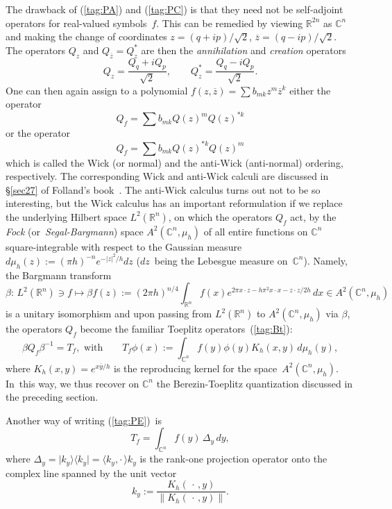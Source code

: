 \documentclass[12pt]{amsart}
\numberwithin{equation}{section}
\theoremstyle{remark}
\newcommand\spr[2]{\langle #1,#2\rangle}
\newcommand\RR{\mathbb R}
\newcommand{\be}{\begin{equation}}
\newcommand{\en}{\end{equation}}
\newcommand{\CC}{\C}
\newcommand{\C}{\mathbb C}
\begin{document}
The drawback of (\ref{tag:PA}) and (\ref{tag:PC}) is that they need not be
self-adjoint operators for real-valued symbols~$f$. This can be remedied by
viewing $\RR^{2n}$ as $\CC^n$ and making the change of coordinates $z=(q+ip)/
\sqrt2$, $\overline z=(q-ip)/\sqrt2$. The operators $Q_z$ and $Q_{\overline
z}=Q_z^*$ are then the {\it annihilation\/} and {\it creation\/} operators
$$ Q_z= \frac{Q_q+i Q_p}{\sqrt 2}, \qquad Q_z^*=\frac{Q_q-i Q_p}{\sqrt2}. $$
One can then again assign to a polynomial $f(z,\overline z)=\sum b_{mk} z^m
\overline z^k$ either the operator
$$ Q_f = \sum b_{mk} Q(z)^m Q(z)^{*k}  $$
or the operator
$$ Q_f = \sum b_{mk} Q(z)^{*k} Q(z)^m  $$
which is called the Wick (or normal) and the anti-Wick (anti-normal) ordering,
respectively. The corresponding Wick and anti-Wick calculi are discussed in
\S\ref{sec27} of Folland's book~\cite{bib:Foll}. The anti-Wick calculus turns
out not to be so interesting, but the Wick calculus has an important
reformulation if we replace the underlying Hilbert space $L^2(\RR^n)$, on which
the operators $Q_f$ act, by the {\it Fock\/} (or~{\it Segal-Bargmann\/}) space
$A^2(\CC^n,\mu_h)$ of all entire functions on $\CC^n$ square-integrable with
respect to the Gaussian measure $d\mu_h(z):=(\pi h)^{-n} e^{-|z|^2/h} dz$
($dz$~being the Lebesgue measure on~$\CC^n$). Namely, the Bargmann transform
\begin{equation}  \beta: \, L^2(\RR^n)\ni f \longmapsto \beta f(z):= (2\pi
h)^{n/4}  \int_{\RR^n} f(x) e^{2\pi x\cdot z -h \pi^2 x\cdot x -z\cdot z/2h}
\, dx \in A^2(\CC^n,\mu_h)  \label{tag:Barg}  \end{equation}
is a unitary isomorphism and upon passing from $L^2(\RR^n)$ to
$A^2(\CC^n,\mu_h)$ via $\beta$, the operators $Q_f$ become the familiar
Toeplitz operators~(\ref{tag:Bt}):
\begin{equation}  \beta Q_f \beta^{-1} = T_f, \text{ with} \qquad T_f \phi(x)
:= \int_{\CC^n} f(y) \phi(y) K_h(x,y) \, d\mu_h(y),  \label{tag:PE}
\end{equation}
where $K_h(x,y)=e^{x\overline y/h}$ is the reproducing kernel for the
space~$A^2(\CC^n,\mu_h)$. In~this way, we thus recover on $\CC^n$ the
Berezin-Toeplitz quantization discussed in the preceding section.

Another way of writing (\ref{tag:PE})~is
\begin{equation}  T_f = \int_{\CC^n} f(y) \,\Delta_y\,dy,  \label{tag:PF}
\end{equation}
where $\Delta_y=\vert k_y\rangle\langle k_y\vert =\spr{k_y}{\cdot\,}k_y$ is the
rank-one projection operator onto the complex line spanned by the unit vector
\be k_y := \frac{K_h(\,\cdot\,,y)}{\|K_h(\,\cdot\,,y)\|}.  \label{tag:KSKS} \en
\end{document}
